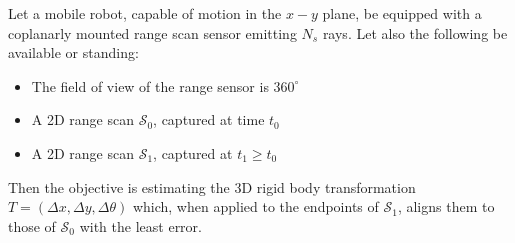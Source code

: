 \begin{problem}
  \label{prob:the_problem}
  Let a mobile robot, capable of motion in the $x-y$ plane, be equipped with a
  coplanarly mounted range scan sensor emitting $N_s$ rays. Let
  also the following be available or standing:
  \begin{itemize}
    \item The field of view of the range sensor is $360^\circ$
    \item A 2D range scan $\mathcal{S}_0$, captured at time $t_0$
    \item A 2D range scan $\mathcal{S}_1$, captured at $t_1 \geq t_0$
  \end{itemize}
\end{problem}
Then the objective is estimating the 3D rigid body transformation
$T = (\Delta x, \Delta y, \Delta \theta)$ which, when applied to the endpoints
of $\mathcal{S}_1$, aligns them to those of $\mathcal{S}_0$ with the least
error.
